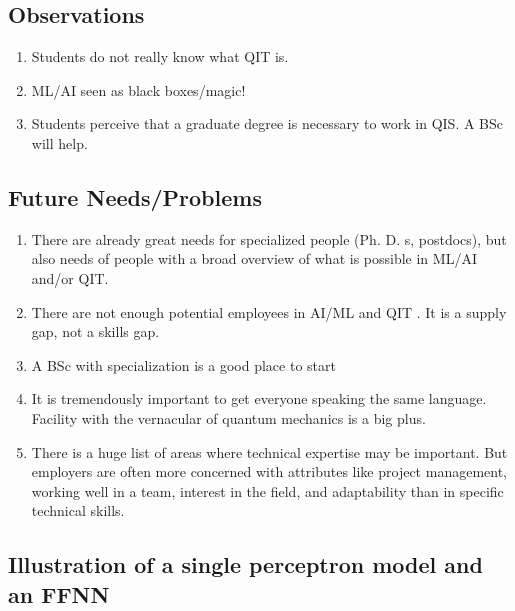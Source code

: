 \documentclass[%
oneside,                 %
final,                   %
10pt]{article}
\begin{document}
\noindent
\subsection{Observations}

\begin{enumerate}
\item Students do not really know what QIT is.

\item ML/AI seen as black boxes/magic!

\item Students perceive that a graduate degree is necessary to work in QIS. A BSc will help.
\end{enumerate}

\noindent
\subsection{Future Needs/Problems}

\begin{enumerate}
\item There are already  great needs for specialized people (Ph. D. s, postdocs), but also needs of  people with a broad overview of what is possible in ML/AI and/or QIT.

\item There are not enough potential employees in AI/ML and QIT . It is a supply gap, not a skills gap.

\item A BSc with specialization  is a good place to start

\item It is tremendously important to get everyone speaking the same language. Facility with the vernacular of quantum mechanics is a big plus.

\item There is a huge list of areas where technical expertise may be important. But employers are often more concerned with attributes like project management, working well in a team, interest in the field, and adaptability than in specific technical skills.
\end{enumerate}

\noindent
\subsection{Illustration of a single perceptron model and an FFNN}
\end{document}
